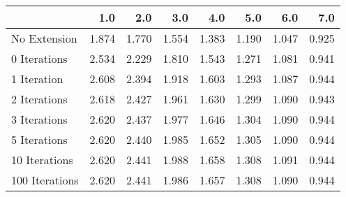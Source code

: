 \begin{tabular}{lrrrrrrr}
\toprule
{} &   1.0 &   2.0 &   3.0 &   4.0 &   5.0 &   6.0 &   7.0 \\
\midrule
No Extension   & 1.874 & 1.770 & 1.554 & 1.383 & 1.190 & 1.047 & 0.925 \\
0 Iterations   & 2.534 & 2.229 & 1.810 & 1.543 & 1.271 & 1.081 & 0.941 \\
1 Iteration    & 2.608 & 2.394 & 1.918 & 1.603 & 1.293 & 1.087 & 0.944 \\
2 Iterations   & 2.618 & 2.427 & 1.961 & 1.630 & 1.299 & 1.090 & 0.943 \\
3 Iterations   & 2.620 & 2.437 & 1.977 & 1.646 & 1.304 & 1.090 & 0.944 \\
5 Iterations   & 2.620 & 2.440 & 1.985 & 1.652 & 1.305 & 1.090 & 0.944 \\
10 Iterations  & 2.620 & 2.441 & 1.988 & 1.658 & 1.308 & 1.091 & 0.944 \\
100 Iterations & 2.620 & 2.441 & 1.986 & 1.657 & 1.308 & 1.090 & 0.944 \\
\bottomrule
\end{tabular}

